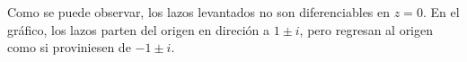 \begin{solution}
\begin{enumerate}[label=\alph*)]
    Como se puede observar, los lazos levantados no son diferenciables en $z = 0$. En el gráfico, los lazos parten del origen en direción a $1 \pm i$, pero regresan al origen como si proviniesen de $-1 \pm i$.
\end{enumerate}
\end{solution}
